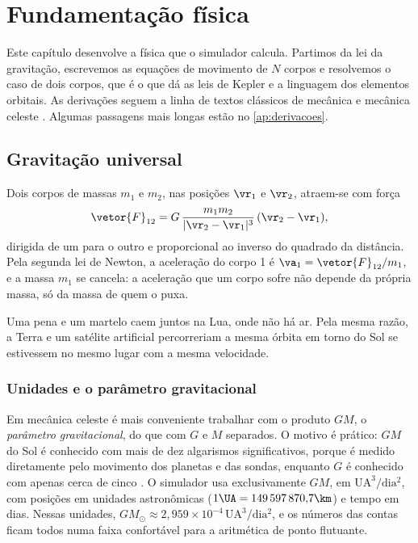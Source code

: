 \chapter{Fundamentação física}\label{cap:fisica}

Este capítulo desenvolve a física que o simulador calcula. Partimos da lei da gravitação, escrevemos as equações de movimento de $N$ corpos e resolvemos o caso de dois corpos, que é o que dá as leis de Kepler e a linguagem dos elementos orbitais. As derivações seguem a linha de textos clássicos de mecânica e mecânica celeste \cite{symon1982,goldstein2002,murray1999,danby1988}. Algumas passagens mais longas estão no \autoref{ap:derivacoes}.

\section{Gravitação universal}

Dois corpos de massas $m_1$ e $m_2$, nas posições $\vr_1$ e $\vr_2$, atraem-se com força
\begin{equation}
  \vetor{F}_{12} = G\,\frac{m_1 m_2}{|\vr_2-\vr_1|^3}\,(\vr_2-\vr_1),
  \label{eq:newton}
\end{equation}
dirigida de um para o outro e proporcional ao inverso do quadrado da distância. Pela segunda lei de Newton, a aceleração do corpo 1 é $\va_1 = \vetor{F}_{12}/m_1$, e a massa $m_1$ se cancela: a aceleração que um corpo sofre não depende da própria massa, só da massa de quem o puxa.

\begin{paracomecar}
Uma pena e um martelo caem juntos na Lua, onde não há ar. Pela mesma razão, a Terra e um satélite artificial percorreriam a mesma órbita em torno do Sol se estivessem no mesmo lugar com a mesma velocidade.
\end{paracomecar}

\subsection{Unidades e o parâmetro gravitacional}

Em mecânica celeste é mais conveniente trabalhar com o produto $GM$, o \emph{parâmetro gravitacional}, do que com $G$ e $M$ separados. O motivo é prático: $GM$ do Sol é conhecido com mais de dez algarismos significativos, porque é medido diretamente pelo movimento dos planetas e das sondas, enquanto $G$ é conhecido com apenas cerca de cinco \cite{park2021}. O simulador usa exclusivamente $GM$, em $\mathrm{UA^3/dia^2}$, com posições em unidades astronômicas ($1\UA = 149\,597\,870{,}7\km$) e tempo em dias. Nessas unidades, $GM_\odot \approx 2{,}959\times10^{-4}\,\mathrm{UA^3/dia^2}$, e os números das contas ficam todos numa faixa confortável para a aritmética de ponto flutuante.

